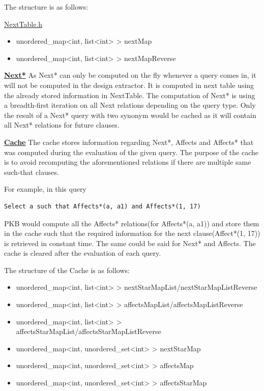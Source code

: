 \documentclass[12pt]{article}
\begin{document}
{{{{{{{{{{The structure is as follows: 

{\underline{NextTable.h}
\begin{itemize}
\item unordered\_map<int, list<int> > nextMap
\item unordered\_map<int, list<int> > nextMapReverse
\end{itemize}
\vspace{6mm}

\textbf{\underline{Next*}}\newline
As Next* can only be computed on the fly whenever a query comes in, it will not be computed in the design extractor. It is computed in next table using the already stored information in NextTable. The computation of Next* is using a breadth-first iteration on all Next relations depending on the query type. Only the result of a Next* query with two synonym would be cached as it will contain all Next* relations for future clauses. \vspace{6mm} \newline
{\underline{\textbf{Cache}}\newline
The cache stores information regarding Next*, Affects and Affects* that was computed during the evaluation of the given query. The purpose of the cache is to avoid recomputing the aforementioned relations if there are multiple same such-that clauses. 

For example, in this query \begin{verbatim}
Select a such that Affects*(a, a1) and Affects*(1, 17)
\end{verbatim} 
PKB would compute all the Affects* relations(for Affects*(a, a1)) and store them in the cache such that the required information for the next clause(Affect*(1, 17)) is retrieved in constant time. The same could be said for Next* and Affects. The cache is cleared after the evaluation of each query.

The structure of the Cache is as follows:

\begin{itemize}
\item unordered\_map<int, list<int> > nextStarMapList/nextStarMapListReverse
\item unordered\_map<int, list<int> > affectsMapList/affectsMapListReverse
\item unordered\_map<int, list<int> > affectsStarMapList/affectsStarMapListReverse
\item unordered\_map<int, unordered\_set<int> > nextStarMap
\item unordered\_map<int, unordered\_set<int> > affectsMap
\item unordered\_map<int, unordered\_set<int> > affectsStarMap
\end{itemize}
}}}}}}}}}}}}
\end{document}
